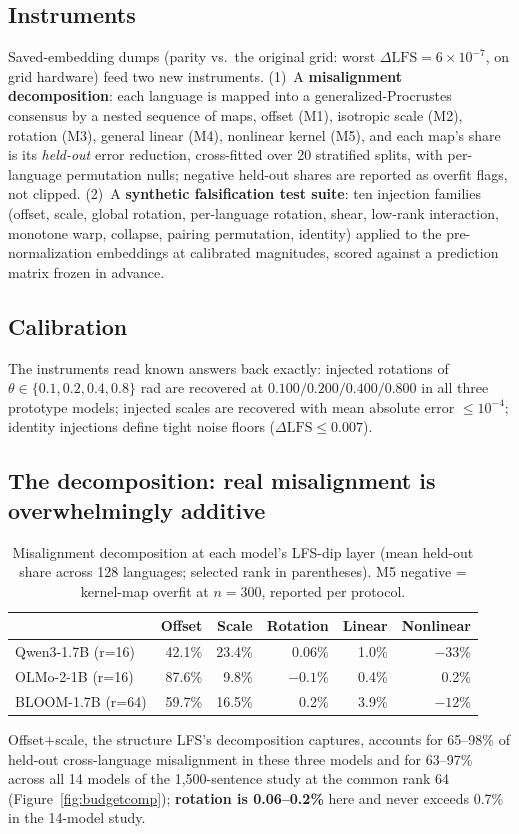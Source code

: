 \documentclass[11pt,a4paper]{article}
\begin{document}
\subsection{Instruments}
Saved-embedding dumps (parity vs.\ the original grid: worst
$\Delta\mathrm{LFS} = 6\times10^{-7}$, on grid hardware) feed two new
instruments. (1)~A \textbf{misalignment decomposition}: each language is mapped into
a generalized-Procrustes consensus by a nested sequence of maps, offset (M1),
isotropic scale (M2), rotation (M3), general linear (M4), nonlinear kernel
(M5), and each map's share is its \emph{held-out} error reduction,
cross-fitted over 20 stratified splits, with per-language permutation nulls;
negative held-out shares are reported as overfit flags, not clipped. (2)~A
\textbf{synthetic falsification test suite}: ten injection families (offset,
scale, global rotation, per-language rotation, shear, low-rank interaction,
monotone warp, collapse, pairing permutation, identity) applied to the
pre-normalization embeddings at calibrated magnitudes, scored against a
prediction matrix frozen in advance.

\subsection{Calibration}
The instruments read known answers back exactly: injected rotations of
$\theta \in \{0.1, 0.2, 0.4, 0.8\}$ rad are recovered at $0.100/0.200/0.400/
0.800$ in all three prototype models; injected scales are recovered with mean
absolute error $\le 10^{-4}$; identity injections define tight noise floors
($\Delta\mathrm{LFS} \le 0.007$).

\subsection{The decomposition: real misalignment is overwhelmingly additive}
\begin{table}[H]
\centering
\small
\caption{Misalignment decomposition at each model's LFS-dip layer (mean held-out
share across 128 languages; selected rank in parentheses). M5 negative =
kernel-map overfit at $n{=}300$, reported per protocol.}
\begin{tabular}{lrrrrr}
\toprule
 & Offset & Scale & Rotation & Linear & Nonlinear \\
\midrule
Qwen3-1.7B (r=16) & 42.1\% & 23.4\% & 0.06\% & 1.0\% & $-33\%$ \\
OLMo-2-1B (r=16) & 87.6\% & 9.8\% & $-0.1\%$ & 0.4\% & 0.2\% \\
BLOOM-1.7B (r=64) & 59.7\% & 16.5\% & 0.2\% & 3.9\% & $-12\%$ \\
\bottomrule
\end{tabular}
\label{tab:budget}
\end{table}
Offset$+$scale, the structure LFS's decomposition captures, accounts for 65--98\% of held-out cross-language misalignment in these three models and for 63--97\% across all 14 models of the 1,500-sentence study at the common rank 64 (Figure~\ref{fig:budgetcomp}); \textbf{rotation is 0.06--0.2\%} here and never exceeds 0.7\% in the 14-model study.
\end{document}
